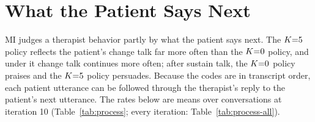 \section{What the Patient Says Next}
\label{sec:patient}

MI judges a therapist behavior partly by what the patient says next.
The $K{=}5$ policy reflects the patient's change talk far more often than the $K{=}0$ policy, and under
it change talk continues more often; after sustain talk, the $K{=}0$ policy praises and the $K{=}5$
policy persuades.
Because the codes are in transcript order, each patient utterance can be followed through the
therapist's reply to the patient's next utterance. The rates below are means over conversations at
iteration 10 (Table~\ref{tab:process}; every iteration: Table~\ref{tab:process-all}).


